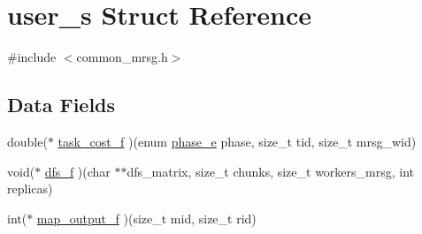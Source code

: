 \hypertarget{structuser__s}{\section{user\-\_\-s \-Struct \-Reference}
\label{structuser__s}
}


{\ttfamily \#include $<$common\-\_\-mrsg.\-h$>$}

\subsection*{\-Data \-Fields}
\begin{DoxyCompactItemize}
\item 
double($\ast$ \hyperlink{structuser__s_a5e44111bc441ef543412b2507e37cd02}{task\-\_\-cost\-\_\-f} )(enum \hyperlink{mrsg_8h_afa14b6e068c0e0b8557777e16f2582f2}{phase\-\_\-e} phase, size\-\_\-t tid, size\-\_\-t mrsg\-\_\-wid)
\item 
void($\ast$ \hyperlink{structuser__s_ae49d248b815f38f868f152e6e277c597}{dfs\-\_\-f} )(char $\ast$$\ast$dfs\-\_\-matrix, size\-\_\-t chunks, size\-\_\-t workers\-\_\-mrsg, int replicas)
\item 
int($\ast$ \hyperlink{structuser__s_ac4bd9204f029bd849edb08e1bdb76845}{map\-\_\-output\-\_\-f} )(size\-\_\-t mid, size\-\_\-t rid)
\end{DoxyCompactItemize}


